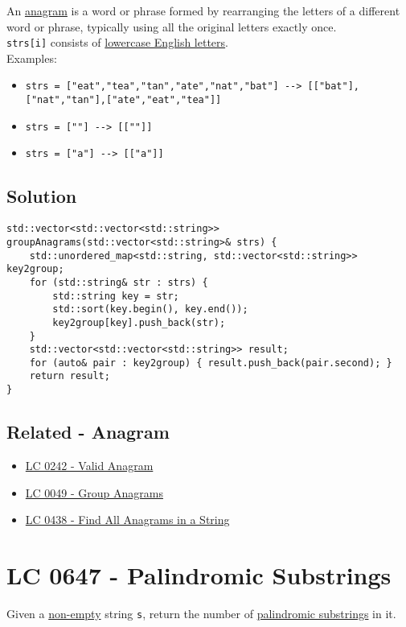 {An \ul{anagram} is a word or phrase formed by rearranging the letters of a different word or phrase, typically using all the original letters exactly once.\\

{\colorbox{CodeBackground}{\lstinline|strs[i]|}} consists of \ul{lowercase English letters}.\\

Examples:
\begin{itemize}
	\item {\colorbox{CodeBackground}{\lstinline|strs = ["eat","tea","tan","ate","nat","bat"] --> [["bat"],["nat","tan"],["ate","eat","tea"]]|}}
	\item {\colorbox{CodeBackground}{\lstinline|strs = [""] --> [[""]]|}}
	\item {\colorbox{CodeBackground}{\lstinline|strs = ["a"] --> [["a"]]|}}
\end{itemize}

\subsection*{Solution}
\begin{lstlisting}
std::vector<std::vector<std::string>> groupAnagrams(std::vector<std::string>& strs) {
	std::unordered_map<std::string, std::vector<std::string>> key2group;
	for (std::string& str : strs) {
		std::string key = str;
		std::sort(key.begin(), key.end());
		key2group[key].push_back(str);
	}
	std::vector<std::vector<std::string>> result;
	for (auto& pair : key2group) { result.push_back(pair.second); }
	return result;
}
\end{lstlisting}

\subsection*{Related - Anagram}
\begin{itemize}
\item \hyperref[lc0242]{LC 0242 - Valid Anagram}
\item \hyperref[lc0049]{LC 0049 - Group Anagrams}
\item \hyperref[lc0438]{LC 0438 - Find All Anagrams in a String}
\end{itemize}

\section{LC 0647 - Palindromic Substrings}\label{lc0647}
Given a \ul{non-empty} string {\colorbox{CodeBackground}{\lstinline|s|}}, return the number of \ul{palindromic substrings} in it.\\

}
